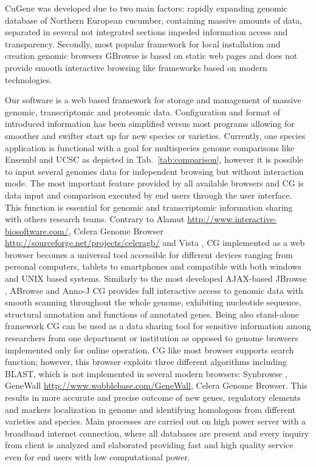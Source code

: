 \documentclass[a4paper]{spie}
\newcommand{\appName}{CuGene}
\newcommand{\appShortcut}{CG}
\begin{document}
\appName{} was developed due to two main factors: rapidly expanding genomic database of Northern European cucumber, containing massive amounts of data,
separated in several not integrated sections impeded information access and transparency.
Secondly, most popular framework for local installation and creation genomic browsers GBrowse is based on static web pages and
does not provide smooth interactive browsing like frameworks based on modern technologies.

Our software is a web based framework for storage and management of massive genomic, transcriptomic and proteomic data.
Configuration and format of introduced information has been simplified versus most programs allowing for smoother and swifter start up for new species or varieties.
Currently, one species application is functional with a goal for multispecies genome comparisons like  Ensembl and UCSC as depicted in Tab.~\ref{tab:comparison},
however it is possible to input several genomes data for independent browsing  but without interaction mode.
The most important feature provided by all available browsers and \appShortcut{} is data input and comparison executed by end users through the user interface.
This function is essential for genomic and transcriptomic information sharing with others research teams.
Contrary to Alamut \url{http://www.interactive-biosoftware.com/}, Celera Genome Browser \url{http://sourceforge.net/projects/celeragb/}
and Vista \cite{visel2007vista}, \appShortcut{} implemented as a web browser becomes a universal tool accessible for different devices ranging from personal computers,
tablets to smartphones and compatible with both windows and UNIX based systems.
Similarly to the most developed AJAX-based JBrowse \cite{skinner2009jbrowse}, ABrowse \cite{kong2012abrowse} and Anno-J \cite{lister2008highly}
\appShortcut{} provides full interactive access to genomic data with smooth scanning throughout the whole genome,
exhibiting nucleotide sequence, structural annotation and functions of annotated genes.
Being also stand-alone framework \appShortcut{} can be used as a data sharing tool for sensitive information
among researchers from one department or institution as opposed to genome browsers implemented only for online operation.
\appShortcut{} like most browser supports search function; however, this browser exploits three different algorithms including BLAST,
which is not implemented in several modern browsers: Synbrowse \cite{pan2005synbrowse}, GeneWall \url{http://www.wobblebase.com/GeneWall},
Celera Genome Browser.
This results in more accurate and precise outcome of new genes, regulatory elements and markers localization in genome and identifying homologous
from different varieties and species.
Main processes are carried out on  high power server with a broadband internet connection,
where all databases are present and every inquiry from client is analyzed and elaborated providing fast and high quality service
even for end users with low computational power.
\end{document}
